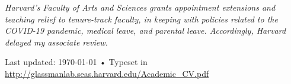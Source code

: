 \documentclass[10pt, a4paper]{article}
\begin{document}





 





\textit{Harvard’s Faculty of Arts and Sciences grants appointment extensions and teaching relief to tenure-track faculty, in keeping with policies related to the COVID-19 pandemic, medical leave, and parental leave. Accordingly, Harvard delayed my associate review.}



\vfill{}

\begin{center}
{\scriptsize  Last updated: \today\- •\- 
Typeset in \href{http://nitens.org/taraborelli/cvtex}{
\XeTeX }\\
\href{http://glassmanlab.seas.harvard.edu/Academic_CV.pdf}{http://glassmanlab.seas.harvard.edu/Academic\_CV.pdf}}
\end{center}
\end{document}
